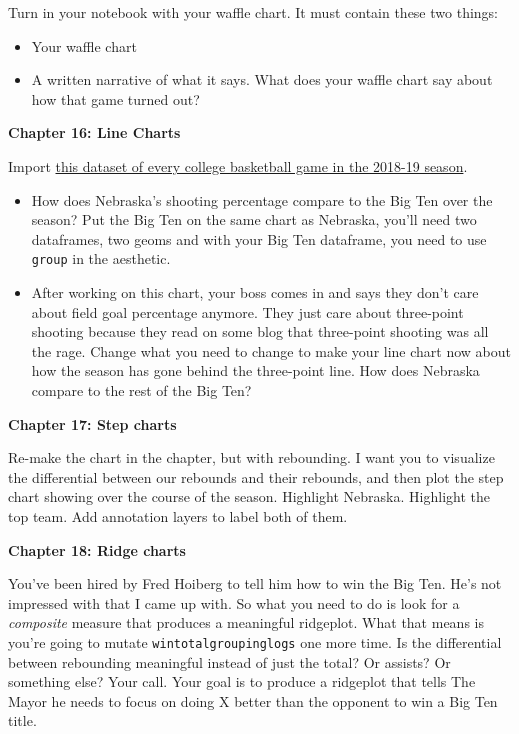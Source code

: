 \documentclass[]{book}
\providecommand{\tightlist}{%
  \setlength{\itemsep}{0pt}\setlength{\parskip}{0pt}}
\begin{document}
Turn in your notebook with your waffle chart. It must contain these two things:

\begin{itemize}
\tightlist
\item
  Your waffle chart
\item
  A written narrative of what it says. What does your waffle chart say about how that game turned out?
\end{itemize}

\textbf{Chapter 16: Line Charts}

Import \href{https://unl.box.com/s/a8m91bro10t89watsyo13yjegb1fy009}{this dataset of every college basketball game in the 2018-19 season}.

\begin{itemize}
\item
  How does Nebraska's shooting percentage compare to the Big Ten over the season? Put the Big Ten on the same chart as Nebraska, you'll need two dataframes, two geoms and with your Big Ten dataframe, you need to use \texttt{group} in the aesthetic.
\item
  After working on this chart, your boss comes in and says they don't care about field goal percentage anymore. They just care about three-point shooting because they read on some blog that three-point shooting was all the rage. Change what you need to change to make your line chart now about how the season has gone behind the three-point line. How does Nebraska compare to the rest of the Big Ten?
\end{itemize}

\textbf{Chapter 17: Step charts}

Re-make the chart in the chapter, but with rebounding. I want you to visualize the differential between our rebounds and their rebounds, and then plot the step chart showing over the course of the season. Highlight Nebraska. Highlight the top team. Add annotation layers to label both of them.

\textbf{Chapter 18: Ridge charts}

You've been hired by Fred Hoiberg to tell him how to win the Big Ten. He's not impressed with that I came up with. So what you need to do is look for a \emph{composite} measure that produces a meaningful ridgeplot. What that means is you're going to mutate \texttt{wintotalgroupinglogs} one more time. Is the differential between rebounding meaningful instead of just the total? Or assists? Or something else? Your call. Your goal is to produce a ridgeplot that tells The Mayor he needs to focus on doing X better than the opponent to win a Big Ten title.
\end{document}
